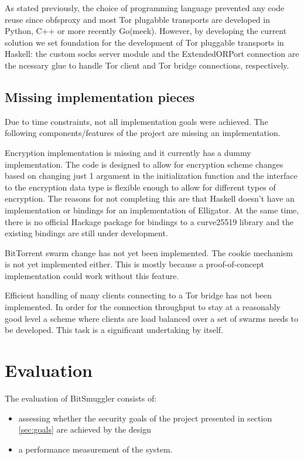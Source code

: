 \documentclass[11pt]{book} %
\newcommand{\projectName}{BitSmuggler }
\begin{document}
As stated previously, the choice of programming language prevented any code reuse since obfsproxy and most Tor plugabble transports are developed in Python, C++ or more recently Go(meek). However, by developing the current solution we set foundation for the development of Tor pluggable transports in Haskell: the custom socks server module and the ExtendedORPort connection are the ncessary glue to handle Tor client and Tor bridge connections, respectively.

\subsection{Missing implementation pieces}

Due to time constraints, not all implementation goals were achieved. The following components/features of the project are missing an implementation.

Encryption implementation is missing and it currently has a dummy implementation. The code is designed to allow for encryption scheme changes based on changing just 1 argument in the initialization function and the interface to the encryption data type is flexible enough to allow for different types of encryption. The reasons for not completing this are that Haskell doesn't have an implementation or bindings for an implementation of Elligator. At the same time,  there is no official Hackage package for bindings to a curve25519 library and the existing bindings are still under development.

BitTorrent swarm change has not yet been implemented. The cookie mechanism is not yet implemented either. This is mostly because a proof-of-concept implementation could work without this feature.

Efficient handling of many clients connecting to a Tor bridge has not been implemented. In order for the connection throughput to stay at a reasonably good level a scheme where clients are load balanced over a set of swarms needs to be developed. This task is a significant undertaking by itself.

\section{Evaluation}

The evaluation of \projectName consists of:
\begin{itemize}
\item assessing whether the security goals of the project presented in section \ref{sec:goals} are achieved by the design 
\item a performance measurement of the system.
\end{itemize}
\end{document}
